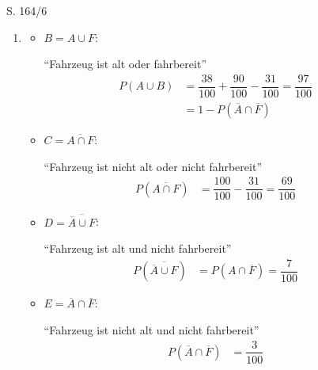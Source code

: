 \begin{Exercise}{S. 164/6}{}
\begin{enumerate}[leftmargin=*]
\begin{enumerate}[label=\alph*),leftmargin=*]
{\begin{minipage}[t]{0.8\linewidth}
\begin{tikzpicture}[remember picture, overlay,font=\footnotesize, color=myg]
            \end{tikzpicture}
            \end{minipage}
            }
        \item [b)] {
            \begin{itemize}[leftmargin=*]
                \item $B = A \cup F$: \qquad \begin{minipage}[t]{0.6\linewidth}
                    ``Fahrzeug ist alt oder fahrbereit''\\[-2.0ex]
                    \begin{align*}
                        P(A \cup B) &= \dfrac{38}{100} + \dfrac{90}{100} - \dfrac{31}{100} = \dfrac{97}{100} &&\\[1.5ex]
                        &= 1 - P(\overline{A} \cap \overline{F}) &&
                    \end{align*}
                \end{minipage}
                \item $C = \overline{A \cap F}$: \qquad \begin{minipage}[t]{0.6\linewidth}
                    ``Fahrzeug ist nicht alt oder nicht fahrbereit''\\[-2.0ex]
                    \begin{align*}
                        P(\overline{A \cap F}) &= \dfrac{100}{100} - \dfrac{31}{100} = \dfrac{69}{100} &&
                    \end{align*}
                \end{minipage}
                \item $D = \overline{\overline{A} \cup F}$: \qquad \begin{minipage}[t]{0.6\linewidth}
                    ``Fahrzeug ist alt und nicht fahrbereit''\\[-2.0ex]
                    \begin{align*}
                        P(\overline{\overline{A} \cup F}) &= P(A \cap \overline{F}) = \dfrac{7}{100}&&
                    \end{align*}
                \end{minipage}
                \item $E = \overline{A} \cap \overline{F}$: \qquad \begin{minipage}[t]{0.6\linewidth}
                    ``Fahrzeug ist nicht alt und nicht fahrbereit''\\[-2.0ex]
                    \begin{align*}
                        P(\overline{A} \cap \overline{F}) &= \dfrac{3}{100}&&
                    \end{align*}
                \end{minipage}
            \end{itemize}
            }
    \end{enumerate}
\end{enumerate}
\end{Exercise}


